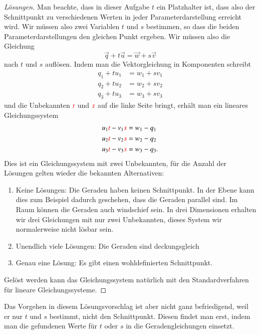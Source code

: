 \begin{proof}[Lösungen]
Man beachte, dass in dieser Aufgabe $t$ ein Platzhalter ist, dass also
der Schnittpunkt zu verschiedenen Werten in jeder Parameterdarstellung
erreicht wird.
Wir müssen also zwei Variablen $t$ und $s$ bestimmen, so dass die beiden
Parameterdarstellungen den gleichen Punkt ergeben.
Wir müssen also die Gleichung
\[
\vec{q} + t\vec{u}
=
\vec{w} + s\vec{v}
\]
nach $t$ und $s$ auflösen.
Indem man die Vektorgleichung in Komponenten schreibt
\begin{align*}
q_1+tu_1 &= w_1+sv_1\\
q_2+tu_2 &= w_2+sv_2\\
q_3+tu_3 &= w_3+sv_3
\end{align*}
und die Unbekannten $\color{red}t$ und $\color{red}s$ auf die linke Seite bringt, erhält
man ein lineares Gleichungssystem 
\begin{align*}
u_1{\color{red}t}-v_1{\color{red}s}&= w_1-q_1\\
u_2{\color{red}t}-v_2{\color{red}s}&= w_2-q_2\\
u_3{\color{red}t}-v_3{\color{red}s}&= w_3-q_3.
\end{align*}
Dies ist ein Gleichungssystem mit zwei Unbekannten, für die Anzahl der Lösungen
gelten wieder die bekannten Alternativen:
\begin{enumerate}
\item Keine Lösungen: Die Geraden haben keinen Schnittpunkt.
In der Ebene
kann dies zum Beispiel dadurch geschehen, dass die Geraden parallel sind.
Im Raum können die Geraden auch windschief sein.
In drei Dimensionen erhalten wir drei Gleichungen mit nur zwei Unbekannten,
dieses System wir normalerweise nicht lösbar sein.
\item Unendlich viele Lösungen: Die Geraden sind deckungsgleich
\item Genau eine Lösung: Es gibt einen wohldefinierten Schnittpunkt.
\end{enumerate}
Gelöst werden kann das Gleichungssystem natürlich mit den Standardverfahren
für lineare Gleichungssysteme.
\end{proof}

Das Vorgehen in diesem Lösungsvorschlag ist aber nicht ganz befriedigend,
weil er nur $t$ und $s$ bestimmt, nicht den Schnittpunkt.
Diesen findet man erst, indem man die gefundenen Werte für $t$ oder $s$
in die Geradengleichungen einsetzt.


